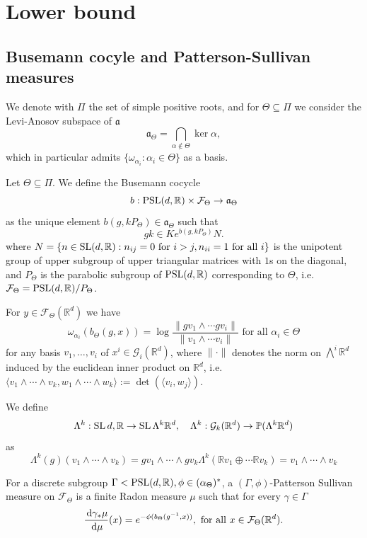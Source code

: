 \documentclass{report}
\begin{document}
\chapter{Lower bound}
\section{Busemann cocyle and Patterson-Sullivan measures}
We denote with $\Pi$ the set of simple positive roots, and for $\Theta \subseteq \Pi$ we consider the Levi-Anosov subspace of $\mathfrak a$
\[
    \mathfrak a_\Theta = \bigcap_{\alpha \notin \Theta} \ker \alpha,
\]
which in particular admits $\{ \omega_{\alpha_i} : \alpha_i \in \Theta \}$ as a basis.
\begin{definition}
    Let $\Theta \subseteq \Pi$. We define the Busemann cocycle
    \[
    b : \operatorname{{\mathrm{PSL}}}(d, \mathbb R) \times \mathcal F_\Theta \to \mathfrak a_\Theta
    \]
    as the unique element $b(g, k P_\Theta) \in \mathfrak a_\Theta$ such that
    \[
    g k \in K e^{b(g, k P_\Theta)} N.
    \]
    where $N = \{ n \in \operatorname{{\mathrm{SL}}}(d, \mathbb R) : n_{ij} = 0 \text{ for } i > j, n_{ii} = 1 \text{ for all } i \}$ is the unipotent group of upper subgroup of upper triangular matrices with $1$s on the diagonal, and $P_\Theta$ is the parabolic subgroup of $\operatorname{{\mathrm{PSL}}}(d, \mathbb R)$ corresponding to $\Theta$, i.e.\ $\mathcal F_\Theta = \operatorname{{\mathrm{PSL}}}(d, \mathbb R)/P_\Theta$.
\end{definition}
\begin{lemma}
For $y \in \mathcal F_\Theta(\mathbb R^d)$ we have    
\[
    \omega_{\alpha_i}(b_\Theta(g, x)) =
    \log \frac{\| g v_1 \wedge \cdots g v_i \|}{ \| v_1 \wedge \cdots v_i \| }
    \text{ for all } \alpha_i \in \Theta
\]
for any basis $v_1, \ldots, v_i$ of $x^i \in \mathcal G_i(\mathbb R^d)$, where $\| \cdot \|$ denotes the norm on $\bigwedge^i \mathbb R^d$ induced by the euclidean inner product on $\mathbb R^d$, 
i.e.\ $ \langle v_1 \wedge \cdots \wedge v_k, w_1 \wedge \cdots \wedge w_k \rangle := \det(\langle v_i, w_j \rangle)$.
\end{lemma}

\begin{definition}
    We define
    \[
    \Lambda^k : \operatorname{{\mathrm{SL}}}{d, \mathbb R} \to \operatorname{{\mathrm{SL}}}{\Lambda^k \mathbb R^d}, \quad
    \Lambda^k : \mathcal G_k(\mathbb R^d) \to \mathbb P(\Lambda^k \mathbb R^d)
    \]
    as
    \[
    \Lambda^k(g)(v_1 \wedge \cdots \wedge v_k) = g v_1 \wedge \cdots \wedge g v_k
    \Lambda^k(\mathbb R v_1 \oplus \cdots \mathbb R v_k) =  v_1 \wedge \cdots \wedge v_k
    \]
\end{definition}
\begin{definition}
    For a discrete subgroup $\Gamma < \operatorname{{\mathrm{PSL}}}(d, \mathbb R), \phi \in (\alpha_\Theta)^*$,
    a $(\Gamma, \phi)$-Patterson Sullivan measure on $\mathcal F_\Theta$ is a finite Radon measure $\mu$ such that for every $\gamma \in \Gamma$
    \[
        \frac{\,\mathrm{d}\gamma_* \mu}{\,\mathrm{d}\mu}(x) = e^{-\phi(b_\Theta(g^{-1},x))}, \text{ for all } x \in \mathcal F_\Theta(\mathbb R^d).
    \]
\end{definition}
\end{document}
